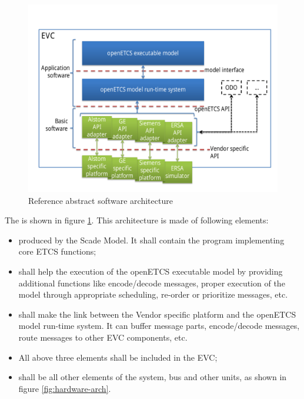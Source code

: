 \documentclass{template/openetcs_report}
\begin{document}
\begin{figure}[htbp]
  \centering
  \includegraphics[width=\linewidth]{software-architecture.pdf}
  \caption{Reference abstract software architecture}
  \label{fig:software-arch}
\end{figure}

The  is shown in figure
\ref{fig:software-arch}. This architecture is made of following
elements:
\begin{itemize}
\item {} produced by the
  \cite{scade-model} Scade Model. It shall contain the program implementing core
  ETCS functions;
\item{} shall help the execution
  of the openETCS executable model by providing additional functions
  like encode/decode messages, proper execution of the model through
  appropriate scheduling, re-order or prioritize messages, etc. 
\item {} shall make the link between
  the Vendor specific platform and the openETCS model run-time system.
  It can buffer message parts, encode/decode messages, route messages
  to other \gls{EVC} components, etc.
\item All above three elements shall be included in the \gls{EVC};
\item {} shall be all other elements of
  the system, bus and other units, as shown in figure
  \ref{fig:hardware-arch}.
\end{itemize}
\end{document}
